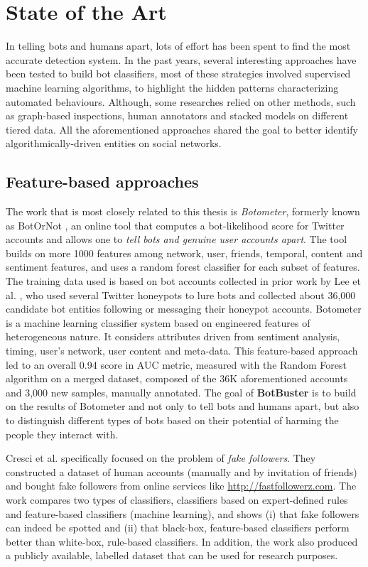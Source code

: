 \chapter{State of the Art}
\label{capitolo2}
\thispagestyle{empty}

In telling bots and humans apart, lots of effort has been spent to find the most accurate detection system. In the past years, several interesting approaches have been tested to build bot classifiers, most of these strategies involved supervised machine learning algorithms, to highlight the hidden patterns characterizing automated behaviours. Although, some researches relied on other methods, such as graph-based inspections, human annotators and stacked models on different tiered data. All the aforementioned approaches shared the goal to better identify algorithmically-driven entities on social networks.

\section{Feature-based approaches}
The work that is most closely related to this thesis is\textit{ Botometer}, formerly known as BotOrNot \cite{Botometer, BotorNot}, an online tool that computes a bot-likelihood score for Twitter accounts and allows one to \emph{tell bots and genuine user accounts apart}. The tool builds on more 1000 features among network, user, friends, temporal, content and sentiment features, and uses a random forest classifier for each subset of features. The training data used is based on bot accounts collected in prior work by Lee et al. \cite{Lee11sevenmonths}, who used several Twitter honeypots to lure bots and collected about 36,000 candidate bot entities following or messaging their honeypot accounts. 
Botometer is a machine learning classifier system based on engineered features of heterogeneous nature. It considers attributes driven from sentiment analysis, timing, user's network, user content and meta-data. This feature-based approach led to an overall 0.94 score in AUC metric, measured with the Random Forest algorithm on a merged dataset, composed of the 36K aforementioned accounts and 3,000 new samples, manually annotated.
The goal of \textbf{BotBuster} is to build on the results of Botometer and not only to tell bots and humans apart, but also to distinguish different types of bots based on their potential of harming the people they interact with.

Cresci et al. \cite{Fake-Followers} specifically
focused on the problem of \emph{fake followers}. They constructed a dataset of human accounts (manually and by invitation of friends) and bought fake followers from online services like \url{http://fastfollowerz.com}. The work compares two types of classifiers, classifiers based on expert-defined rules and feature-based classifiers (machine learning), and shows (i) that fake followers 
can indeed be spotted and (ii) that black-box, feature-based classifiers perform better than white-box, rule-based classifiers. In addition, the work also produced a publicly available, labelled dataset that can be used for research purposes.

